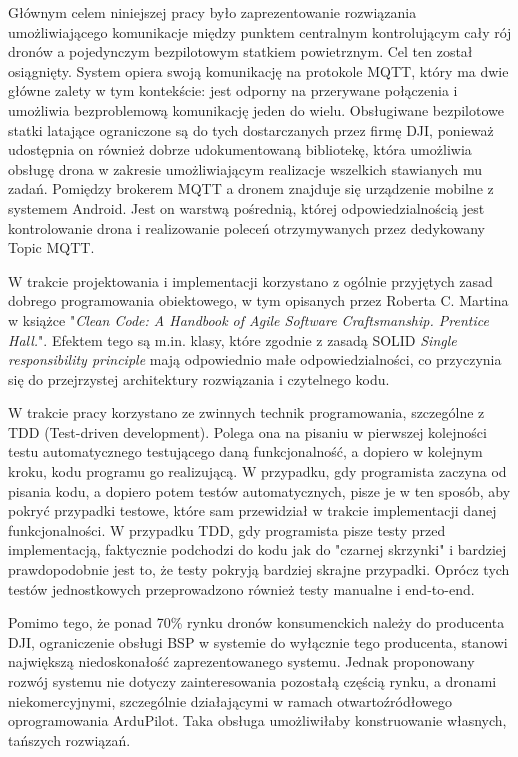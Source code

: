 Głównym celem niniejszej pracy było zaprezentowanie rozwiązania umożliwiającego komunikacje między punktem centralnym kontrolującym cały rój dronów a pojedynczym bezpilotowym statkiem powietrznym. Cel ten został osiągnięty. System opiera swoją komunikację na protokole MQTT, który ma dwie główne zalety w tym kontekście: jest odporny na przerywane połączenia i umożliwia bezproblemową komunikację jeden do wielu. Obsługiwane bezpilotowe statki latające ograniczone są do tych dostarczanych przez firmę DJI, ponieważ udostępnia on również dobrze udokumentowaną bibliotekę, która umożliwia obsługę drona w zakresie umożliwiającym realizacje wszelkich stawianych mu zadań. Pomiędzy brokerem MQTT a dronem znajduje się urządzenie mobilne z systemem Android. Jest on warstwą pośrednią, której odpowiedzialnością jest kontrolowanie drona i realizowanie poleceń otrzymywanych przez dedykowany Topic MQTT.

W trakcie projektowania i implementacji korzystano z ogólnie przyjętych zasad dobrego programowania obiektowego, w tym opisanych przez Roberta C. Martina w książce "\textit{Clean Code: A Handbook of Agile Software Craftsmanship. Prentice Hall.}". Efektem tego są m.in. klasy, które zgodnie z zasadą SOLID \textit{Single responsibility principle} mają odpowiednio małe odpowiedzialności, co przyczynia się do przejrzystej architektury rozwiązania i czytelnego kodu. \cite{solid}\cite{clean-code}

W trakcie pracy korzystano ze zwinnych technik programowania, szczególne z TDD (Test-driven development). Polega ona na pisaniu w pierwszej kolejności testu automatycznego testującego daną funkcjonalność, a dopiero w kolejnym kroku, kodu programu go realizującą. W przypadku, gdy programista zaczyna od pisania kodu, a dopiero potem testów automatycznych, pisze je w ten sposób, aby pokryć przypadki testowe, które sam przewidział w trakcie implementacji danej funkcjonalności. W przypadku TDD, gdy programista pisze testy przed implementacją, faktycznie podchodzi do kodu jak do "czarnej skrzynki" i bardziej prawdopodobnie jest to, że testy pokryją bardziej skrajne przypadki. Oprócz tych testów jednostkowych przeprowadzono również testy manualne i end-to-end.

Pomimo tego, że ponad 70\% rynku dronów konsumenckich należy do producenta DJI, ograniczenie obsługi BSP w systemie do wyłącznie tego producenta, stanowi największą niedoskonałość zaprezentowanego systemu. Jednak proponowany rozwój systemu nie dotyczy zainteresowania pozostałą częścią rynku, a dronami niekomercyjnymi, szczególnie działającymi w ramach otwartoźródłowego oprogramowania ArduPilot. Taka obsługa umożliwiłaby konstruowanie własnych, tańszych rozwiązań.

